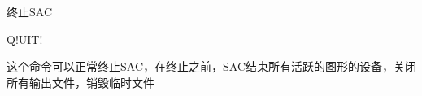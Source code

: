 \label{cmd:quit}

终止SAC

\begin{SACSTX}
Q!UIT!
\end{SACSTX}

这个命令可以正常终止SAC，在终止之前，SAC结束所有活跃的图形的设备，关闭所有输出文件，销毁临时文件
